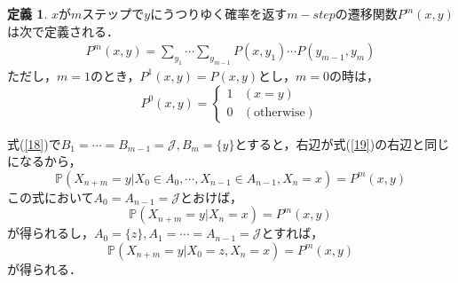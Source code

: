 \documentclass[12pt, a4paper]{jsarticle}
\theoremstyle{definition}
\newtheorem{defn}{定義}[section]
\begin{document}
\begin{screen}
	\begin{defn}
		$x$が$m$ステップで$y$にうつりゆく確率を返す$m-step$の遷移関数$P^m (x,y)$は次で定義される．
		\begin{align}
			P^m(x,y) = \sum_{y_1} \cdots \sum_{y_{m-1}} P(x,y_1) \cdots P(y_{m-1},y_{m}) \label{19}
		\end{align}
		ただし，$m=1$のとき，$P^1(x,y) = P(x,y)$とし，$m=0$の時は，
		\[P^0(x,y) = \begin{cases}
			1 & (x=y) \\
			0 & (\text{otherwise})
\end{cases}\]
	\end{defn}
\end{screen}
式(\ref{18})で$B_1 = \cdots = B_{m-1} = \mathcal{J}, B_m = \{y\}$とすると，右辺が式(\ref{19})の右辺と同じになるから，
\begin{equation}
	\mathbb{P}(X_{n+m} = y | X_0 \in A_0 ,\cdots,X_{n-1} \in A_{n-1}, X_n = x) = P^m(x,y) \label{20}
\end{equation}
この式において$A_0 = A_{n-1} = \mathcal{J}$とおけば，
\begin{equation}
	\mathbb{P}(X_{n+m} = y | X_n = x) = P^m(x,y) \label{21}
\end{equation}
が得られるし，$A_0 = \{z\} ,A_1 = \cdots = A_{n-1} = \mathcal{J}$とすれば，
\begin{equation}
	\mathbb{P}(X_{n+m} = y | X_0 = z , X_n = x) = P^m(x,y)  \label{22}
\end{equation}
が得られる．
\end{document}
